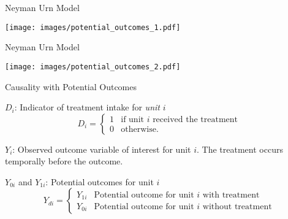 \documentclass{beamer}
\numberwithin{equation}{section}
\begin{document}
\begin{frame}{Neyman Urn Model}

\centering
  \texttt{[image: images/potential\_outcomes\_1.pdf]}

\end{frame}

\begin{frame}{Neyman Urn Model}

\centering
  \texttt{[image: images/potential\_outcomes\_2.pdf]}

\end{frame}

\begin{frame}{Causality with Potential Outcomes}

\begin{definition}[Treatment]
$D_i$: Indicator of treatment intake for {\em unit} $i$
 \[
 D_i = \left\{
 \begin{array}{ll}
  1 & \mbox{if unit $i$ received the treatment}\\
  0 & \mbox{otherwise}.
 \end{array}
 \right.
 \]
\end{definition}

\begin{definition}[Outcome]
 $Y_i$: Observed outcome variable of interest for unit $i$. The treatment occurs temporally before the outcome.
\end{definition}

\begin{definition}
$Y_{0i}$ and $Y_{1i}$: Potential outcomes for unit $i$
 \[
 Y_{di} = \left\{
 \begin{array}{ll}
  Y_{1i} & \mbox{Potential outcome for unit $i$ with treatment}\\
  Y_{0i} & \mbox{Potential outcome for unit $i$ without treatment}
 \end{array}
 \right.
 \]
\end{definition}

\end{frame}
\end{document}
